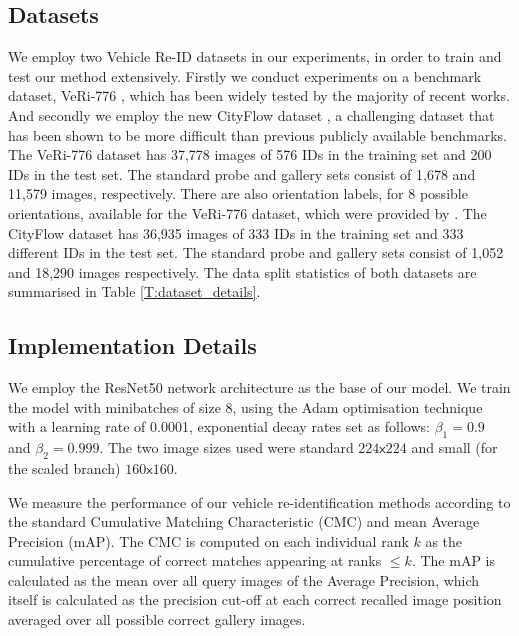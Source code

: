 \documentclass[10pt,twocolumn,letterpaper]{article}
\def\x{{\mathsf x}}
\begin{document}
\subsection{Datasets}
We employ two Vehicle Re-ID datasets in our experiments, in order to train and test our method extensively. Firstly we conduct experiments on a benchmark dataset, VeRi-776 \cite{liu2016veri}, which has been widely tested by the majority of recent works. And secondly we employ the new CityFlow dataset \cite{tang2019cityflow}, a challenging dataset that has been shown to be more difficult than previous publicly available benchmarks.
%
The VeRi-776 dataset \cite{liu2016veri} has 37,778 images of 576 IDs in the training set and 200
IDs in the test set. The standard probe and gallery sets consist of 1,678 and 11,579
images, respectively. There are also orientation labels, for 8 possible orientations, available for the VeRi-776 dataset, which were provided by \cite{wang2017orientation}.
%
%
The CityFlow dataset \cite{tang2019cityflow} has 36,935 images of 333 IDs in the training set and 333 different IDs in the test set. The standard probe and gallery sets consist of 1,052 and 18,290 images respectively.
The data split statistics of both datasets are summarised in Table \ref{T:dataset_details}.

\subsection{Implementation Details}
We employ the ResNet50 \cite{he2016deep} network
architecture as the base of our model. We train the model with
minibatches of size 8, using the Adam optimisation technique with a
learning rate of 0.0001, exponential decay rates set as follows:
$\beta_1=0.9$ and $\beta_2=0.999$. The two image sizes used were
standard $224\x224$ and small (for the scaled branch) $160\x160$.

We measure the performance of our vehicle re-identification methods according to the standard Cumulative Matching Characteristic (CMC) and mean Average Precision (mAP). The CMC is computed on each individual rank $k$ as the cumulative percentage of correct matches appearing
at ranks $\leq k$. The mAP is calculated as the mean over all query images of the Average Precision, which itself is calculated as the precision cut-off at each correct recalled image position averaged over all possible correct gallery images.
\end{document}
